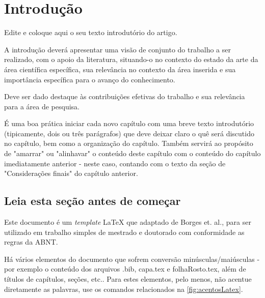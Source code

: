 


\chapter{Introdução}
\label{chap:introducao}

Edite e coloque aqui o seu texto introdutório do artigo.

A introdução deverá apresentar uma visão de conjunto do trabalho a ser realizado, com o apoio da literatura, situando-o no contexto do estado da arte da área científica específica, sua relevância no contexto da área inserida e sua importância específica para o avanço do conhecimento.

Deve ser dado destaque às contribuições efetivas do trabalho e sua relevância para a área de pesquisa.

É uma boa prática iniciar cada novo capítulo com uma breve texto introdutório (tipicamente, dois ou três parágrafos) que deve deixar claro o quê será discutido no capítulo, bem como a organização do capítulo. Também servirá ao propósito de "amarrar"{} ou "alinhavar"{}  o conteúdo deste capítulo com o conteúdo do capítulo imediatamente anterior - neste caso, contando  com o texto da seção de "Considerações finais"{}  do capítulo anterior.



\section{Leia esta seção antes de começar }
\label{sec:antesleiame}

Este documento é um \emph{template} \LaTeX{} que adaptado de Borges et. al., para ser utilizado em trabalho simples de mestrado e doutorado com conformidade as regras da ABNT. 

Há vários elementos do documento que sofrem conversão minúsculas/maiúsculas - por exemplo o conteúdo dos arquivos {\ttfamily .bib}, {\ttfamily capa.tex} e {\ttfamily folhaRosto.tex}, além de títulos de capítulos, seções, etc.. Para estes elementos, pelo menos, não acentue diretamente as palavras, use os comandos relacionados na \autoref{fig:acentosLatex}.

